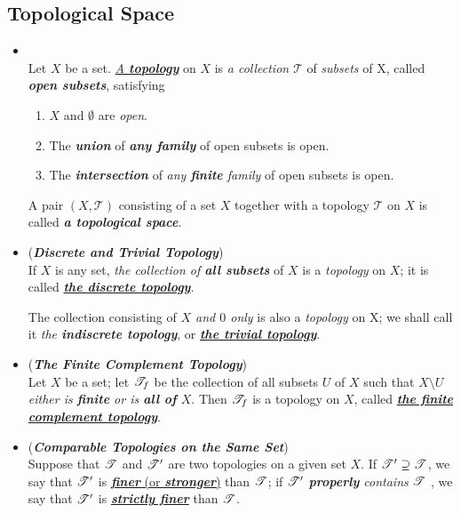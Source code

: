 \documentclass[11pt]{article}
\begin{document}
\subsection{Topological Space}
\begin{itemize}
\item 
\begin{definition} \citep{munkres2000topology}\\
Let $X$ be a set. \underline{\emph{A \textbf{topology}}} on $X$ is \emph{a collection} $\mathscr{T}$ of \emph{subsets} of X, called \emph{\textbf{open subsets}}, satisfying
\begin{enumerate}
\item $X$ and $\emptyset$ are \emph{open}.
\item The \emph{\textbf{union}} of \emph{\textbf{any family}} of open subsets is open.
\item The \emph{\textbf{intersection}} of \emph{any \textbf{finite} family} of open subsets is open.
\end{enumerate}
A pair $(X, \mathscr{T})$ consisting of a set $X$ together with a topology $\mathscr{T}$ on $X$ is called \emph{\textbf{a topological space}}.
\end{definition}

\item \begin{example}(\emph{\textbf{Discrete and Trivial Topology}})\\
If $X$ is any set, \emph{the collection of \textbf{all subsets}} of $X$ is a \emph{topology} on $X$; it is called \underline{\emph{\textbf{the discrete topology}}}. 

The collection consisting of \emph{$X$ and $0$ only} is also a \emph{topology} on X; we shall call it \emph{the \textbf{indiscrete topology}}, or \underline{\emph{\textbf{the trivial topology}}}.
\end{example}

\item \begin{example} (\emph{\textbf{The Finite Complement Topology}})\\
Let $X$ be a set; let ${\mathscr T}_{f}$ be the collection of all subsets $U$ of $X$ such that \emph{$X \setminus U$ either is \textbf{finite} or is \textbf{all of} $X$}. Then ${\mathscr T}_f$ is a topology on $X$, called \underline{\emph{\textbf{the finite complement topology}}}. 
\end{example}

\item \begin{definition} (\emph{\textbf{Comparable Topologies on the Same Set}})\\
Suppose that ${\mathscr T}$ and ${\mathscr T}'$ are two topologies on a given set $X$. If ${\mathscr T}' \supseteq {\mathscr T}$, we say that ${\mathscr T}'$  is \underline{\emph{\textbf{finer}} (or \emph{\textbf{stronger}})} than ${\mathscr T}$; if ${\mathscr T}'$ \emph{\textbf{properly} contains} ${\mathscr T}$ , we say that ${\mathscr T}'$ is \underline{\emph{\textbf{strictly finer}}} than ${\mathscr T}$. 


\end{definition}
\end{itemize}
\end{document}
